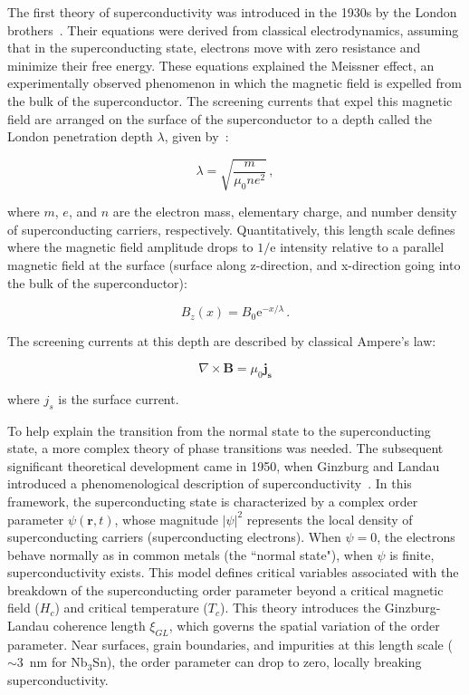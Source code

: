     The first theory of superconductivity was introduced in the 1930s by the London brothers~\cite{londonProblemMolecularTheory1948}. Their equations were derived from classical electrodynamics, assuming that in the superconducting state, electrons move with zero resistance and minimize their free energy. These equations explained the Meissner effect, an experimentally observed phenomenon in which the magnetic field is expelled from the bulk of the superconductor. The screening currents that expel this magnetic field are arranged on the surface of the superconductor to a depth called the London penetration depth $\lambda$, given by~\cite{tinkhamIntroductionSuperconductivity2004}:
    
    \begin{equation}
        \lambda = \sqrt{\frac{m}{\mu_0 ne^2}} \,,
        \label{eq:lambda}
    \end{equation}

    \noindent where $m$, $e$, and $n$ are the electron mass, elementary charge, and number density of superconducting carriers, respectively. Quantitatively, this length scale defines where the magnetic field amplitude drops to $1/\text{e}$ intensity relative to a parallel magnetic field at the surface (surface along z-direction, and x-direction going into the bulk of the superconductor):

    \begin{equation}
            B_{z}(x)=B_{0}\text{e}^{-x/\lambda} \,.
        \label{eq:MagneticFieldPen}
    \end{equation}  
    
    \noindent The screening currents at this depth are described by classical Ampere's law:
    
    \begin{equation}
        {\displaystyle \nabla \times \mathbf {B} =\mu _{0}\mathbf {j_s} }
        \label{eq:ampereslaw}
    \end{equation}

    \noindent where $j_s$ is the surface current. 
    
    To help explain the transition from the normal state to the superconducting state, a more complex theory of phase transitions was needed. The subsequent significant theoretical development came in 1950, when Ginzburg and Landau introduced a phenomenological description of superconductivity~\cite{ginzburgTheorySuperconductivity1950}. In this framework, the superconducting state is characterized by a complex order parameter $\psi(\mathbf{r}, t)$, whose magnitude $|\psi|^2$ represents the local density of superconducting carriers (superconducting electrons). When $\psi = 0$, the electrons behave normally as in common metals (the ``normal state"), when $\psi$ is finite, superconductivity exists. This model defines critical variables associated with the breakdown of the superconducting order parameter beyond a critical magnetic field ($H_c$) and critical temperature ($T_c$). This theory introduces the Ginzburg-Landau coherence length $\xi_{GL}$, which governs the spatial variation of the order parameter. Near surfaces, grain boundaries, and impurities at this length scale ($\sim3$~nm for Nb$_3$Sn), the order parameter can drop to zero, locally breaking superconductivity.
    
